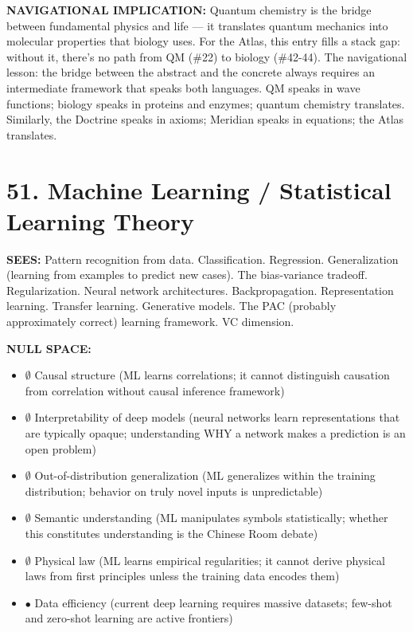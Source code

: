 \textbf{NAVIGATIONAL IMPLICATION:} Quantum chemistry is the bridge between fundamental physics and life — it translates quantum mechanics into molecular properties that biology uses. For the Atlas, this entry fills a stack gap: without it, there's no path from QM (\#22) to biology (\#42-44). The navigational lesson: the bridge between the abstract and the concrete always requires an intermediate framework that speaks both languages. QM speaks in wave functions; biology speaks in proteins and enzymes; quantum chemistry translates. Similarly, the Doctrine speaks in axioms; Meridian speaks in equations; the Atlas translates.


\bigskip\noindent\makebox[\textwidth]{\color{rulegray}\rule{5cm}{0.3pt}}\bigskip


\section*{51. Machine Learning / Statistical Learning Theory}


\textbf{SEES:} Pattern recognition from data. Classification. Regression. Generalization (learning from examples to predict new cases). The bias-variance tradeoff. Regularization. Neural network architectures. Backpropagation. Representation learning. Transfer learning. Generative models. The PAC (probably approximately correct) learning framework. VC dimension.


\textbf{NULL SPACE:}

\begin{itemize}[nosep,leftmargin=*]
  \item $\emptyset$ Causal structure (ML learns correlations; it cannot distinguish causation from correlation without causal inference framework)
  \item $\emptyset$ Interpretability of deep models (neural networks learn representations that are typically opaque; understanding WHY a network makes a prediction is an open problem)
  \item $\emptyset$ Out-of-distribution generalization (ML generalizes within the training distribution; behavior on truly novel inputs is unpredictable)
  \item $\emptyset$ Semantic understanding (ML manipulates symbols statistically; whether this constitutes understanding is the Chinese Room debate)
  \item $\emptyset$ Physical law (ML learns empirical regularities; it cannot derive physical laws from first principles unless the training data encodes them)
  \item $\bullet$ Data efficiency (current deep learning requires massive datasets; few-shot and zero-shot learning are active frontiers)
\end{itemize}


